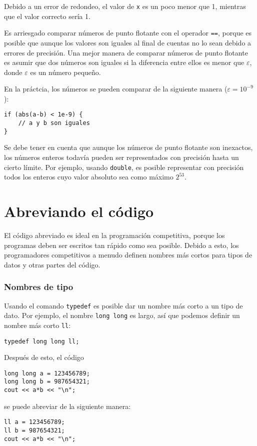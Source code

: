 Debido a un error de redondeo,
el valor de \texttt{x} es un poco menor que 1,
mientras que el valor correcto sería 1.

Es arriesgado comparar números de punto flotante
con el operador \texttt{==},
porque es posible que aunque los valores son iguales 
al final de cuentas no lo sean debido a errores de precisión.
Una mejor manera de comparar números de punto flotante
es asumir que dos números son iguales
si la diferencia entre ellos es menor que $\varepsilon$,
donde $\varepsilon$ es un número pequeño.

En la práctcia, los números se pueden comparar
de la siguiente manera ($\varepsilon=10^{-9}$):

\begin{lstlisting}
if (abs(a-b) < 1e-9) {
    // a y b son iguales
}
\end{lstlisting}

Se debe tener en cuenta que aunque los números de punto flotante son inexactos,
los números enteros todavía pueden ser
representados con precisión hasta un cierto límite.
Por ejemplo, usando \texttt{double},
es posible representar con precisión todos
los enteros cuyo valor absoluto sea como máximo $2^{53}$.

\section{Abreviando el código}

El código abreviado es ideal en la programación competitiva,
porque los programas deben ser escritos
tan rápido como sea posible.
Debido a esto, los programadores competitivos a menudo definen
nombres más cortos para tipos de datos y otras partes del código.

\subsubsection{Nombres de tipo}
Usando el comando \texttt{typedef}
es posible dar un nombre más corto
a un tipo de dato.
Por ejemplo, el nombre \texttt{long long} es largo,
así que podemos definir un nombre más corto \texttt{ll}:
\begin{lstlisting}
typedef long long ll;
\end{lstlisting}
Después de esto, el código
\begin{lstlisting}
long long a = 123456789;
long long b = 987654321;
cout << a*b << "\n";
\end{lstlisting}
se puede abreviar de la siguiente manera:
\begin{lstlisting}
ll a = 123456789;
ll b = 987654321;
cout << a*b << "\n";
\end{lstlisting}

